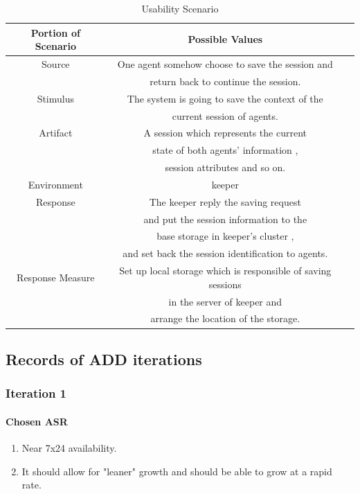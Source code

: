 \documentclass{article}
\begin{document}
	\begin{center}
		\begin{table}[!htb]
		\begin{tabular}{ccc}
		\toprule  
		Portion of Scenario & Possible Values\\
		\midrule 
		Source 				& One agent somehow choose to save the session and \\
							& return back to continue the session.\\
		Stimulus 			& The system is going to save the context of the \\
							& current session of agents.\\
		Artifact 			& A session which represents the current \\
							& state of both agents' information , \\
							& session attributes and so on.\\
		Environment 		& keeper \\
		Response 			& The keeper reply the saving request \\
							& and put the session information to the \\
							& base storage in keeper's cluster , \\
							& and set back the session identification to agents.\\
		Response Measure 	& Set up local storage which is responsible of saving sessions\\
							&  in the server of keeper and  \\
							& arrange the location of the storage.\\
		\bottomrule
		\end{tabular}
		\caption{Usability Scenario}
		\end{table}
	\end{center}
	
\newpage

	\subsection{Records of ADD iterations}
		\subsubsection{Iteration 1}
			\paragraph{Chosen ASR}
			\begin{enumerate}
			\item Near 7x24 availability.
			\item It should allow for "leaner" growth and should be able to grow at a rapid rate.
			\end{enumerate}
\end{document}
